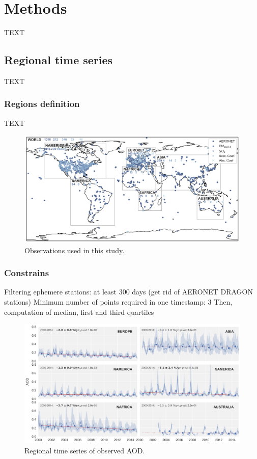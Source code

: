 \documentclass[journal abbreviation, manuscript]{copernicus}
\begin{document}
\section{Methods}
TEXT


\subsection{Regional time series}
TEXT

\subsubsection{Regions definition}
TEXT
\begin{figure}
 \includegraphics[width=\columnwidth]{../scripts/figs/maps/av_obs.png}
 \caption{Observations used in this study.}
 \label{map_obs}
\end{figure}

\subsubsection{Constrains}
Filtering ephemere stations: at least 300 days (get rid of AERONET DRAGON stations)
Minimum number of points required in one timestamp: 3
Then, computation of median, first and third quartiles
\begin{figure}
 \includegraphics[width=\columnwidth]{../scripts/figs/ts/panel-od550aer.png}
 \caption{Regional time series of observed AOD.}
 \label{ts_aod}
\end{figure}
\end{document}
